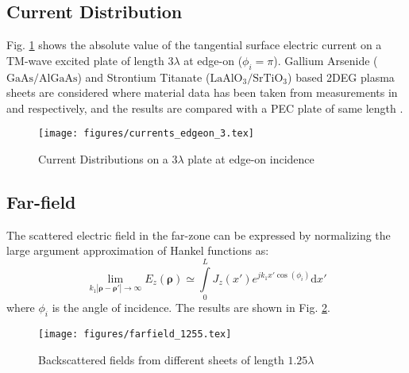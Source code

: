 \documentclass[conference, 10pt]{IEEEtran}
\renewcommand{\v}[1]{\mathbf{#1}} %
\newcommand{\p}{\rho}  %
\renewcommand{\inf}{\infty}  %
\renewcommand{\^}{\hat}  %
\begin{document}
\subsection{Current Distribution}
%
Fig. \ref{fig:edgeon} shows the absolute value of the tangential surface electric current on a TM-wave excited plate of length $3 \lambda$ at edge-on ($\phi_i = \pi$). Gallium Arsenide ($\mathrm{GaAs}/\mathrm{AlGaAs}$) and Strontium Titanate ($\mathrm{LaAlO_3}/\mathrm{SrTiO_3}$) based 2DEG plasma sheets are considered where material data has been taken from measurements in \cite{burke2000high} and \cite{herranz2012high} respectively, and the results are compared with a PEC plate of same length \cite{senior1979backscattering}.

%
\begin{figure}[h]
  \begin{center}
    \noindent
    \texttt{[image: figures/currents\_edgeon\_3.tex]}
    \caption{Current Distributions on a $3\lambda$ plate at edge-on incidence}
    \label{fig:edgeon}
  \end{center}
\end{figure}
%
%   
%
%   
%
\subsection{Far-field}
%
The scattered electric field in the far-zone can be expressed by normalizing the large argument approximation of Hankel functions as:
%
\begin{equation}
  \lim_{k_1|\v \p - \v \p'|\to\inf} E_z(\v \p) \simeq \int \limits_{0}^{L} J_z(x') e^{j k_1 x' \cos(\phi_i)} \mathrm{d}x'
  \label{eq:far-field}
\end{equation}
%
where $\phi_i$ is the angle of incidence. The results are shown in Fig. \ref{fig:rcs}.
%
\begin{figure}[h]
  \begin{center}
    \noindent
    \texttt{[image: figures/farfield\_1255.tex]}
    \caption{Backscattered fields from different sheets of length $1.25\lambda$}
    \label{fig:rcs}
  \end{center}
\end{figure}
%   
\end{document}
